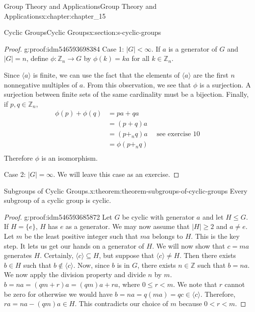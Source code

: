 \documentclass[oneside,10pt,]{book}
\numberwithin{equation}{section}
\begin{document}
\begin{chapterptx}{Group Theory and Applications}{}{Group Theory and Applications}{}{}{x:chapter:chapter_15}
\begin{sectionptx}{Cyclic Groups}{}{Cyclic Groups}{}{}{x:section:s-cyclic-groups}
\begin{proof}{}{g:proof:idm546593698384}
Case 1: \(\lvert G\rvert < \infty\). If \(a\) is a generator of \(G\) and \(\lvert G\rvert =n\), define \(\phi:\mathbb{Z}_n \to  G\) by \(\phi(k) = k a\) for all \(k \in \mathbb{Z}_n\).%
\par
Since \(\langle a \rangle\) is finite, we can use the fact that the elements of \(\langle a \rangle\) are the first \(n\) nonnegative multiples of \(a\). From this observation, we see that \(\phi\) is a surjection. A surjection between finite sets of the same cardinality must be a bijection. Finally, if \(p,q \in  \mathbb{Z}_n\),%
\begin{equation*}
\begin{split}
\phi(p)+\phi(q) &= p a + q a\\
&= (p+q)a \\
&= (p +_n q)a \quad \textrm{     see exercise 10}\\
& = \phi(p +_n q)\\ 
\end{split}
\end{equation*}
Therefore \(\phi\) is an isomorphism.%
\par
Case 2: \(\lvert G\rvert =\infty\). We will leave this case as an exercise.%
\end{proof}
\begin{theorem}{Subgroups of Cyclic Groups.}{}{x:theorem:theorem-subgroups-of-cyclic-groups}%
Every subgroup of a cyclic group is cyclic.%
\end{theorem}
\begin{proof}{}{g:proof:idm546593685872}
Let \(G\) be cyclic with generator \(a\) and let \(H \leq  G\). If \(H = \{e\}\), \(H\) has \(e\) as a generator.  We may now assume that \(\lvert H\rvert \geq 2\) and \(a \neq  e\). Let \(m\) be the least positive integer such that \(m a\) belongs to \(H\). This is the key step. It lets us get our hands on a generator of \(H\). We will now show that \(c= m a\) generates \(H\).  Certainly, \(\langle c \rangle \subseteq  H\), but suppose that \(\langle c \rangle \neq  H\). Then there exists \(b \in  H\) such that \(b \notin  \langle c \rangle\). Now, since \(b\) is in \(G\), there exists \(n \in
\mathbb{Z}\) such that \(b = n a\). We now apply the division property and divide \(n\) by \(m\). \(b = n a = (q m+r)a = (q m)a+r a\), where \(0 \leq r < m\).  We note that \(r\) cannot be zero for otherwise we would have  \(b = n a = q(m a) = q c \in  \langle c \rangle\).   Therefore, \(r a = n a - (q m) a \in  H\).  This contradicts our choice of \(m\) because \(0 < r < m\).%
\end{proof}

\end{sectionptx}
\end{chapterptx}
\end{document}
